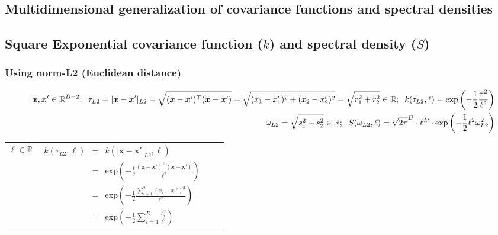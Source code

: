 \documentclass[onecolumn,a4paper,11pt]{article}
\begin{document}
\begin{landscape}

\section{Multidimensional generalization of covariance functions and spectral densities}

\subsection{Square Exponential covariance function ($k$) \textbf and spectral density ($S$)}
\vspace{-2mm}
\subsubsection{Using norm-L2 (Euclidean distance)}
\vspace{-10mm}

\begin{table}[H]
\small
\begin{eqnarray*}
\vspace{-20mm}
&&\bm{x}, \bm{x}' \in \mathbb{R}^{D=2}; \hspace{2mm}\tau_{L2} =|\bm{x}-\bm{x}'|_{L2} = \sqrt{(\bm{x}-\bm{x}')^\top(\bm{x}-\bm{x}')} = \sqrt{(x_1-x_1')^2+(x_2-x_2')^2}  = \sqrt{r_1^2+r_2^2} \in \mathbb{R}; \hspace{2mm} k(\tau_{L2},\ell) = \mathrm{exp}\left(-\frac{1}{2} \frac{\tau^2}{\ell^2} \right)\\
&& \omega_{L2}= \sqrt{s_1^2+s_2^2} \in \mathbb{R}; \hspace{2mm} S(\omega_{L2},\ell) = \sqrt{2\pi}^D \cdot \ell^D \cdot \mathrm{exp}\left(-\frac{1}{2} \ell^2 \omega_{L2}^2 \right)
\end{eqnarray*}
\normalsize
  \begin{center}
    \begin{tabular}{|c|c|c|c|}
       \hline
       
       \multicolumn{1}{|p{1.5cm}|}{
       \vspace{1mm}
       $\ell \in \mathbb{R}$
       }
       
        & \multicolumn{1}{|p{7.2cm}|}{\small
         \begin{eqnarray*}
		k(\tau_{L2},\ell) &=& k(|\bm{x}-\bm{x}'|_{L2},\ell)\\
		 &=& \mathrm{exp}\left(-\frac{1}{2} \frac{(\bm{x}-\bm{x}')^\top(\bm{x}-\bm{x}')}{\ell^2} \right)\\
		&=& \mathrm{exp}\left(-\frac{1}{2} \frac{\sum_{i=1}^{2}(x_i-x_i')^2}{\ell^2} \right) \\
		&=& \mathrm{exp}\left(-\frac{1}{2} \sum_{i=1}^{D}\frac{r_i^2}{\ell^2} \right)
         \end{eqnarray*}
       }
       

\end{tabular}
\end{center}
\end{table}
\end{landscape}
\end{document}
